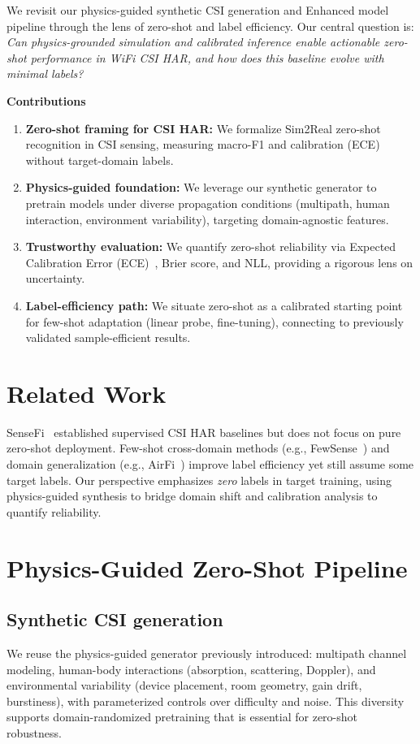 \documentclass[journal]{IEEEtran}
\begin{document}
We revisit our physics-guided synthetic CSI generation and Enhanced model pipeline through the lens of zero-shot and label efficiency. Our central question is: \emph{Can physics-grounded simulation and calibrated inference enable actionable zero-shot performance in WiFi CSI HAR, and how does this baseline evolve with minimal labels?}

\textbf{Contributions}
\begin{enumerate}
  \item \textbf{Zero-shot framing for CSI HAR:} We formalize Sim2Real zero-shot recognition in CSI sensing, measuring macro-F1 and calibration (ECE) without target-domain labels.
  \item \textbf{Physics-guided foundation:} We leverage our synthetic generator to pretrain models under diverse propagation conditions (multipath, human interaction, environment variability), targeting domain-agnostic features.
  \item \textbf{Trustworthy evaluation:} We quantify zero-shot reliability via Expected Calibration Error (ECE)~\cite{calibration_guo2017}, Brier score, and NLL, providing a rigorous lens on uncertainty.
  \item \textbf{Label-efficiency path:} We situate zero-shot as a calibrated starting point for few-shot adaptation (linear probe, fine-tuning), connecting to previously validated sample-efficient results.
\end{enumerate}

\section{Related Work}
SenseFi~\cite{yang2023sensefi} established supervised CSI HAR baselines but does not focus on pure zero-shot deployment. Few-shot cross-domain methods (e.g., FewSense~\cite{fewsense2022}) and domain generalization (e.g., AirFi~\cite{airfi2022}) improve label efficiency yet still assume some target labels. Our perspective emphasizes \emph{zero} labels in target training, using physics-guided synthesis to bridge domain shift and calibration analysis to quantify reliability.

\section{Physics-Guided Zero-Shot Pipeline}
\subsection{Synthetic CSI generation}
We reuse the physics-guided generator previously introduced: multipath channel modeling, human-body interactions (absorption, scattering, Doppler), and environmental variability (device placement, room geometry, gain drift, burstiness), with parameterized controls over difficulty and noise. This diversity supports domain-randomized pretraining that is essential for zero-shot robustness.
\end{document}
